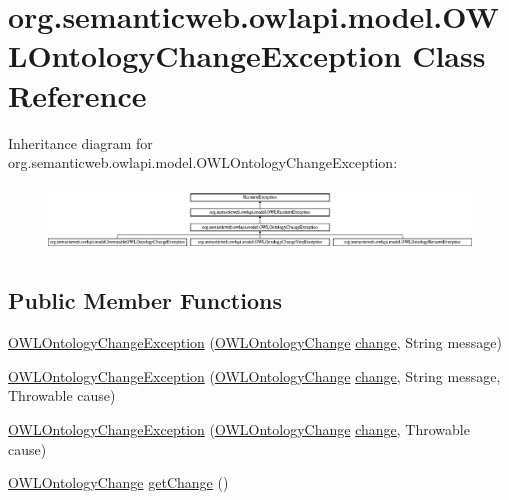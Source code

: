 \hypertarget{classorg_1_1semanticweb_1_1owlapi_1_1model_1_1_o_w_l_ontology_change_exception}{\section{org.\-semanticweb.\-owlapi.\-model.\-O\-W\-L\-Ontology\-Change\-Exception Class Reference}
\label{classorg_1_1semanticweb_1_1owlapi_1_1model_1_1_o_w_l_ontology_change_exception}
}
Inheritance diagram for org.\-semanticweb.\-owlapi.\-model.\-O\-W\-L\-Ontology\-Change\-Exception\-:\begin{figure}[H]
\begin{center}
\leavevmode
\includegraphics[height=1.740482cm]{classorg_1_1semanticweb_1_1owlapi_1_1model_1_1_o_w_l_ontology_change_exception}
\end{center}
\end{figure}
\subsection*{Public Member Functions}
\begin{DoxyCompactItemize}
\item 
\hyperlink{classorg_1_1semanticweb_1_1owlapi_1_1model_1_1_o_w_l_ontology_change_exception_abeb497f3934faec103aaa5b5e819dc94}{O\-W\-L\-Ontology\-Change\-Exception} (\hyperlink{classorg_1_1semanticweb_1_1owlapi_1_1model_1_1_o_w_l_ontology_change}{O\-W\-L\-Ontology\-Change} \hyperlink{classorg_1_1semanticweb_1_1owlapi_1_1model_1_1_o_w_l_ontology_change_exception_a9e4c14dc90fcc563956fb7207c67640a}{change}, String message)
\item 
\hyperlink{classorg_1_1semanticweb_1_1owlapi_1_1model_1_1_o_w_l_ontology_change_exception_aab1d6b5cd3911d72dd7bc5ad6179352d}{O\-W\-L\-Ontology\-Change\-Exception} (\hyperlink{classorg_1_1semanticweb_1_1owlapi_1_1model_1_1_o_w_l_ontology_change}{O\-W\-L\-Ontology\-Change} \hyperlink{classorg_1_1semanticweb_1_1owlapi_1_1model_1_1_o_w_l_ontology_change_exception_a9e4c14dc90fcc563956fb7207c67640a}{change}, String message, Throwable cause)
\item 
\hyperlink{classorg_1_1semanticweb_1_1owlapi_1_1model_1_1_o_w_l_ontology_change_exception_aa2db5fe37356382830bee0b36059b628}{O\-W\-L\-Ontology\-Change\-Exception} (\hyperlink{classorg_1_1semanticweb_1_1owlapi_1_1model_1_1_o_w_l_ontology_change}{O\-W\-L\-Ontology\-Change} \hyperlink{classorg_1_1semanticweb_1_1owlapi_1_1model_1_1_o_w_l_ontology_change_exception_a9e4c14dc90fcc563956fb7207c67640a}{change}, Throwable cause)
\item 
\hyperlink{classorg_1_1semanticweb_1_1owlapi_1_1model_1_1_o_w_l_ontology_change}{O\-W\-L\-Ontology\-Change} \hyperlink{classorg_1_1semanticweb_1_1owlapi_1_1model_1_1_o_w_l_ontology_change_exception_a06e7ba9c615b03cfe77cd6e085e3dcd6}{get\-Change} ()
\end{DoxyCompactItemize}
